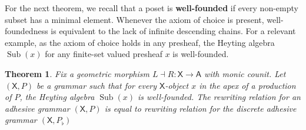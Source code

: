 \documentclass{amsart}
\newcommand{\A}{\cat{A}}
\newcommand{\X}{\cat{X}}
\newcommand{\cat}[1]{\mathsf{#1}}
\newcommand{\from}{\colon}
\DeclareMathOperator{\Sub}{Sub}
\newtheorem{theorem}{Theorem}[section]
\theoremstyle{remark}
\theoremstyle{definition}
\begin{document}
For the next theorem, we recall that a poset is \textbf{well-founded} if
every non-empty subset has a minimal element.  Whenever the axiom of
choice is present, well-foundedness is equivalent to the lack of
infinite descending chains. For a relevant example, as the axiom of
choice holds in any presheaf, the Heyting algebra $ \Sub ( x ) $ for
any finite-set valued presheaf $ x $ is well-founded.

\begin{theorem}
\label{lem:production-same-rewrite-relation-as-discrete}
Fix a geometric morphism $ L \dashv R \from \X \to \A $ with monic
counit. Let $ ( \X , P ) $ be a grammar such that for every
$ \X $-object $ x $ in the apex of a production of $ P $, the Heyting
algebra $ \Sub (x) $ is well-founded.  The rewriting relation for an
adhesive grammar $ ( \X , P ) $ is equal to rewriting relation for the
discrete adhesive grammar $ ( \X , P_{\flat} ) $
\end{theorem}
\end{document}
